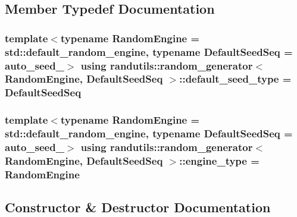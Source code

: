 \subsection{Member Typedef Documentation}
\subsubsection[{\texorpdfstring{default\+\_\+seed\+\_\+type}{default_seed_type}}]{\setlength{\rightskip}{0pt plus 5cm}template$<$typename Random\+Engine  = std\+::default\+\_\+random\+\_\+engine, typename Default\+Seed\+Seq  = auto\+\_\+seed\+\_$>$ using {\bf randutils\+::random\+\_\+generator}$<$ Random\+Engine, Default\+Seed\+Seq $>$\+::{\bf default\+\_\+seed\+\_\+type} =  Default\+Seed\+Seq}\hypertarget{classrandutils_1_1random__generator_a424b01b5232f91d42163369ad6bd3b11}{}\label{classrandutils_1_1random__generator_a424b01b5232f91d42163369ad6bd3b11}
\subsubsection[{\texorpdfstring{engine\+\_\+type}{engine_type}}]{\setlength{\rightskip}{0pt plus 5cm}template$<$typename Random\+Engine  = std\+::default\+\_\+random\+\_\+engine, typename Default\+Seed\+Seq  = auto\+\_\+seed\+\_$>$ using {\bf randutils\+::random\+\_\+generator}$<$ Random\+Engine, Default\+Seed\+Seq $>$\+::{\bf engine\+\_\+type} =  Random\+Engine}\hypertarget{classrandutils_1_1random__generator_a7ccbb95be67d7cd19f4b128be21b4ac3}{}\label{classrandutils_1_1random__generator_a7ccbb95be67d7cd19f4b128be21b4ac3}


\subsection{Constructor \& Destructor Documentation}
